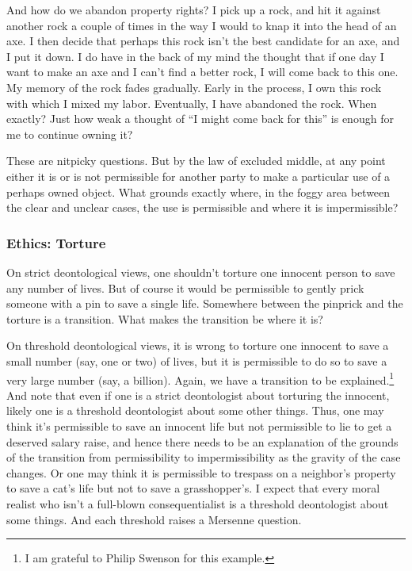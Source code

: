 And how do we abandon property rights? I pick up a rock, and hit it against another rock a couple of times in the way
I would to knap it into the head of an axe. I then decide that perhaps this rock isn't the best candidate for an axe, and I
put it down. I do have in the back of my mind the thought that if one day I want to make an axe and I can't find a better 
rock, I will come back to this one. My memory of the rock fades gradually. Early in the process, I own this 
rock with which I mixed my labor. Eventually, I have abandoned the rock. When exactly? Just how weak a thought of ``I might 
come back for this'' is enough for me to continue owning it? 

These are nitpicky questions. But by the law of excluded middle, at any point either it is or is not permissible 
for another party to make a 
particular use of a perhaps owned object. What grounds exactly where, in the foggy area between the clear and unclear cases, the
use is permissible and where it is impermissible? 

\subsubsection{Ethics: Torture}
On strict deontological views, one shouldn't torture one innocent person to save any number of lives. But of course
it would be permissible to gently prick someone with a pin to save a single life. Somewhere between the pinprick
and the torture is a transition. What makes the transition be where it is?

On threshold deontological views, it is wrong to torture one innocent to save a small number (say, one or two) of lives,
but it is permissible to do so to save a very large number (say, a billion). Again, we have a transition to be 
explained.\footnote{I am grateful to Philip Swenson for this example.} And note that even if one is a strict deontologist
about torturing the innocent, likely one is a threshold deontologist about some other things. Thus, one may think it's
permissible to save an innocent life but not permissible to lie to get a deserved salary raise,
and hence there needs to be an explanation of the grounds of the transition from permissibility to impermissibility
as the gravity of the case changes. Or
one may think it is permissible to trespass on a neighbor's property to save a cat's life but not to save a grasshopper's.
I expect that every moral realist who isn't a full-blown consequentialist is a threshold deontologist about some things.
And each threshold raises a Mersenne question.

